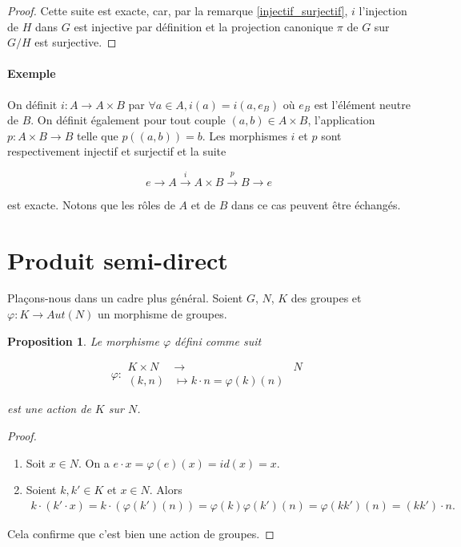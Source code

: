 \documentclass[french]{report}
\newtheorem{prop}{Proposition}[section]
\begin{document}
\begin{proof}
  Cette suite est exacte, car, par la remarque \ref{injectif_surjectif}, $i$ l'injection de $H$ dans $G$ est injective par définition et la projection canonique $\pi$ de $G$ sur $G/H$ est surjective.
\end{proof}

\paragraph{Exemple}

On définit $i : A \to A \times B$ par $\forall a \in A, i(a) = i(a,e_B)$ où $e_B$ est l'élément neutre de $B$. On définit également pour tout couple $(a,b) \in A \times B$, l'application $p : A \times B \to B $ telle que $p((a,b)) = b$. Les morphismes $i$ et $p$ sont respectivement injectif et surjectif et la suite

$$ e \longrightarrow A \stackrel{i}{\longrightarrow} A \times B \stackrel{p}{\longrightarrow} B \longrightarrow e$$

est exacte. Notons que les rôles de $A$ et de $B$ dans ce cas peuvent être échangés.

\section{Produit semi-direct}

Plaçons-nous dans un cadre plus général. Soient $G$, $N$, $K$ des groupes et $\varphi : K \to Aut(N)$ un morphisme de groupes.

\begin{prop}
  Le morphisme $\varphi$ défini comme suit

  $$ \varphi:
    \begin{array}{lll}
    K \times N & \longrightarrow & N \\
    (k,n) & \longmapsto k \cdot n = \varphi(k)(n)
    \end{array}$$

    est une action de $K$ sur $N$.
\end{prop}

\begin{proof}

\

  \begin{enumerate}
    \item Soit $ x \in N$. On a  $e \cdot x  = \varphi(e)(x) = id(x) = x$.
    \item Soient $k, k' \in K$ et $x \in N$. Alors \begin{gather*}
      k \cdot (k' \cdot x) = k \cdot (\varphi(k')(n)) = \varphi(k) \varphi(k')(n) = \varphi(kk')(n) = (kk') \cdot n.
    \end{gather*}
  \end{enumerate}

  Cela confirme que c'est bien une action de groupes.
\end{proof}
\end{document}
